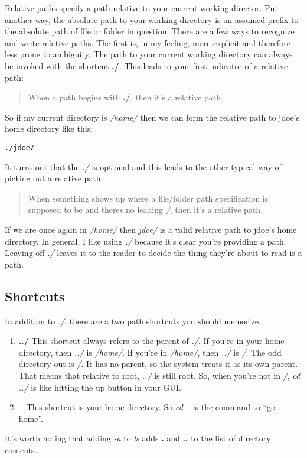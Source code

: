 \documentclass[]{tufte-handout}
\begin{document}
Relative paths specify a path relative to your current working director. Put another way, the absolute path to your working directory is an assumed prefix to the absolute path of file or folder in question.  There are a few ways to recognize and write relative paths.  The first is, in my feeling, more explicit and therefore less prone to ambiguity. The path to your current working directory can always be invoked with the shortcut \textbf{./}. This leads to your first indicator of a relative path:
\begin{quote}
When a path begins with \textbf{./}, then it's a relative path.
\end{quote}
So if my current directory is \textit{/home/} then we can form the relative path to jdoe's home directory like this:
\begin{verbatim}
./jdoe/
\end{verbatim}
It turns out that the \textit{./} is optional and this leads to the other typical way of picking out a relative path.
\begin{quote}
When something shows up where a file/folder path specification is supposed to be and theres no leading \textit{/}, then it's a relative path.
\end{quote}
If we are once again in \textit{/home/} then \textit{jdoe/} is a valid relative path to jdoe's home directory.  In general, I like using \textit{./} because it's clear you're providing a path. Leaving off \textit{./} leaves it to the reader to decide the thing they're about to read is a path.

\subsection{Shortcuts}

In addition to \textit{./}, there are a two path shortcuts you should memorize.
\begin{enumerate}
\item \textbf{../}  \newline
This shortcut always refers to the parent of \textit{./}.  If you're in your home directory, then \textit{../} is \textit{/home/}. If you're in \textit{/home/}, then \textit{../} is \textit{/}. The odd directory out is \textit{/}. It has no parent, so the system treats it as its own parent.  That means that relative to root, \textit{../} is still root.  So, when you're not in \textit{/}, \textit{cd ../} is like hitting the up button in your GUI. 

\item \textbf{~} \newline
This shortcut is your home directory.  So \textit{cd ~} is the command to ``go home''.
\end{enumerate}
It's worth noting that adding \textit{-a} to \textit{ls} adds \textbf{.} and \textbf{..} to the list of directory contents.
\end{document}
